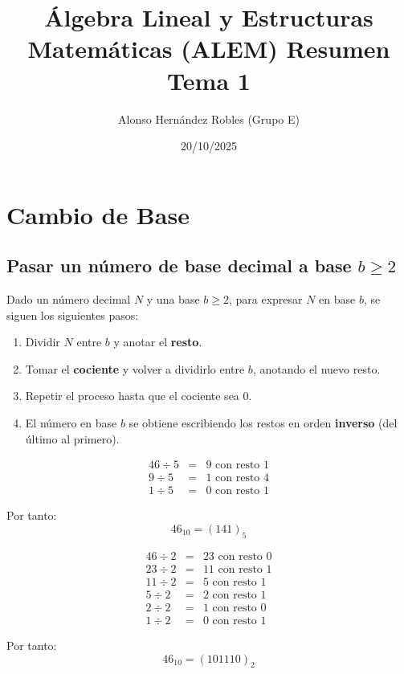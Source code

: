\documentclass[a4paper,12pt]{article}
\title{Álgebra Lineal y Estructuras Matemáticas (ALEM) Resumen Tema 1}
\author{Alonso Hernández Robles (Grupo E)}
\date{20/10/2025}
\begin{document}
\maketitle

\tableofcontents
\newpage


\section{Cambio de Base}

\subsection{Pasar un número de base decimal a base \(b \geq 2\)}

\begin{procedimiento}
Dado un número decimal \( N \) y una base \( b \geq 2 \), para expresar \( N \) en base \( b \), se siguen los siguientes pasos:

\begin{enumerate}
    \item Dividir \( N \) entre \( b \) y anotar el \textbf{resto}.
    \item Tomar el \textbf{cociente} y volver a dividirlo entre \( b \), anotando el nuevo resto.
    \item Repetir el proceso hasta que el cociente sea \( 0 \).
    \item El número en base \( b \) se obtiene escribiendo los restos en orden \textbf{inverso} (del último al primero).
\end{enumerate}
\end{procedimiento}

\begin{ejemplo}[title={Pasar \(46_{10}\) a base \(5\)}]
\[
\begin{array}{rcl}
46 \div 5 &=& 9 \text{ con resto } 1\\
9 \div 5 &=& 1 \text{ con resto } 4\\
1 \div 5 &=& 0 \text{ con resto } 1
\end{array}
\]

Por tanto:
\[
46_{10} = (141)_5
\]
\end{ejemplo}

\begin{ejemplo}[title={Pasar \(46_{10}\) a base \(2\)}]
\[
\begin{array}{rcl}
46 \div 2 &=& 23 \text{ con resto } 0\\
23 \div 2 &=& 11 \text{ con resto } 1\\
11 \div 2 &=& 5 \text{ con resto } 1\\
5 \div 2 &=& 2 \text{ con resto } 1\\
2 \div 2 &=& 1 \text{ con resto } 0\\
1 \div 2 &=& 0 \text{ con resto } 1
\end{array}
\]

Por tanto:
\[
46_{10} = (101110)_2
\]
\end{ejemplo}
\end{document}
